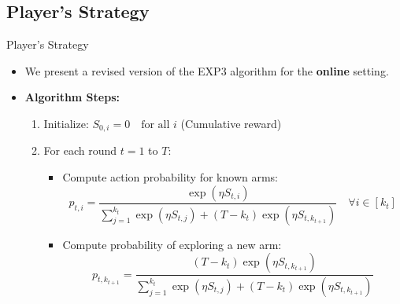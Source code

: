 \documentclass{beamer}
\begin{document}
\subsection{Player's Strategy}
\begin{frame}{Player's Strategy}
\begin{itemize}
    \item We present a revised version of the EXP3 algorithm for the \textbf{online} setting.
    
    \item \textbf{Algorithm Steps:}
    \begin{enumerate}
        \item Initialize: \( S_{0,i} = 0 \quad \text{for all } i \) \hfill (Cumulative reward)
        \vspace{3mm}
        \item For each round \( t = 1 \) to \( T \):
        \begin{itemize}
            \item Compute action probability for known arms:
            \[
            p_{t,i} = \frac{\exp(\eta S_{t,i})}{\sum_{j=1}^{k_t} \exp(\eta S_{t,j}) + (T - k_t) \exp(\eta S_{t,k_{t+1}})} \quad \forall i \in [k_t]
            \]
            
            \item Compute probability of exploring a new arm:
            \[
            p_{t,k_{t+1}} = \frac{(T - k_t) \exp(\eta S_{t,k_{t+1}})}{\sum_{j=1}^{k_t} \exp(\eta S_{t,j}) + (T - k_t) \exp(\eta S_{t,k_{t+1}})}
            \]
        \end{itemize}
    \end{enumerate}
\end{itemize}
\end{frame}
\end{document}
